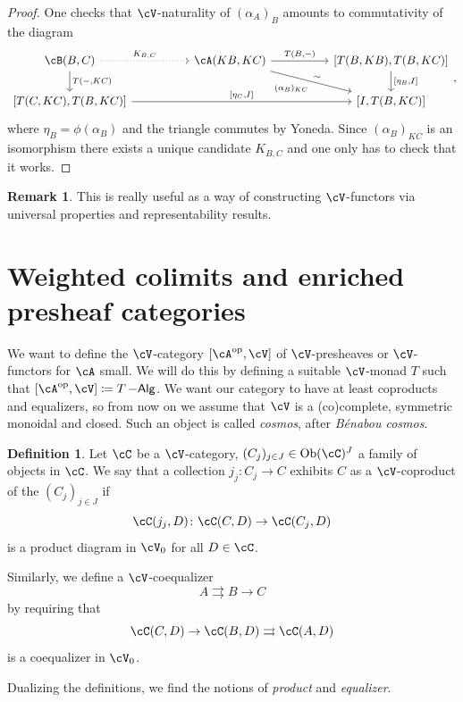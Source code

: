 \documentclass[a4paper,11pt,oneside,openany]{scrbook}
\DeclareMathOperator{\Alg}{-\mathsf{Alg}}
\DeclareMathOperator{\op}{\text{op}}
\DeclareMathOperator{\Ob}{Ob}
\theoremstyle{definition}
\theoremstyle{definition}
\newtheorem{defn}[thm]{Definition} %
\newtheorem{rmk}[thm]{Remark}
\begin{document}
\begin{proof}
    One checks that $\cV$-naturality of $(\alpha_A)_B$ amounts to commutativity of the diagram
    \[
    \begin{tikzcd}[column sep = 5em]
        \cB(B,C)\ar[r, dotted, "K_{B,C}"]\ar[d, "{T(-,KC)}"]
        & \cA(KB,KC)\ar[r, "{T(B,-)}"]\ar[dr, "\sim"', swap, "{(\alpha_B)_{KC}}"]
        & {[T(B,KB),T(B,KC)]}\ar[d, "{[\eta_B, I]}"] \\
        {[T(C,KC),T(B,KC)]}\ar[rr, "{[\eta_C,I]}"]
        && {[I,T(B,KC)]}
    \end{tikzcd}
    ,\]
    where $\eta_B=\phi(\alpha_B)$ and the triangle commutes by Yoneda. Since $(\alpha_B)_{KC}$ is an isomorphism there exists a unique candidate $K_{B,C}$ and one only has to check that it works.
\end{proof}

\begin{rmk}
    This is really useful as a way of constructing $\cV$-functors via universal properties and representability results.
\end{rmk}

\section{Weighted colimits and enriched presheaf categories}

We want to define the $\cV$-category $[\cA^{\op},\cV]$ of $\cV$-presheaves or $\cV$-functors for $\cA$ small. We will do this by defining a suitable $\cV$-monad $T$ such that $[\cA^{\op},\cV]\coloneqq T\Alg$. We want our category to have at least coproducts and equalizers, so from now on we assume that $\cV$ is a (co)complete, symmetric monoidal and closed. Such an object is called \emph{cosmos}, after \emph{B\'enabou cosmos}.

\begin{defn}
    Let $\cC$ be a $\cV$-category, $(C_j)_{j\in J}\in\Ob(\cC)^J$ a family of objects in $\cC$. We say that a collection $j_j\colon C_j\rightarrow C$ exhibits $C$ as a $\cV$-coproduct of the $(C_j)_{j\in J}$ if$$\cC(j_j,D)\colon\cC(C,D)\rightarrow\cC(C_j,D)$$is a product diagram in $\cV_0$ for all $D\in\cC$.
    
    Similarly, we define a $\cV$-coequalizer$$A\rightrightarrows B\rightarrow C$$ by requiring that $$\cC(C,D)\rightarrow\cC(B,D)\rightrightarrows\cC(A,D)$$is a coequalizer in $\cV_0$.
    
    Dualizing the definitions, we find the notions of \emph{product} and \emph{equalizer}.
\end{defn}
\end{document}
